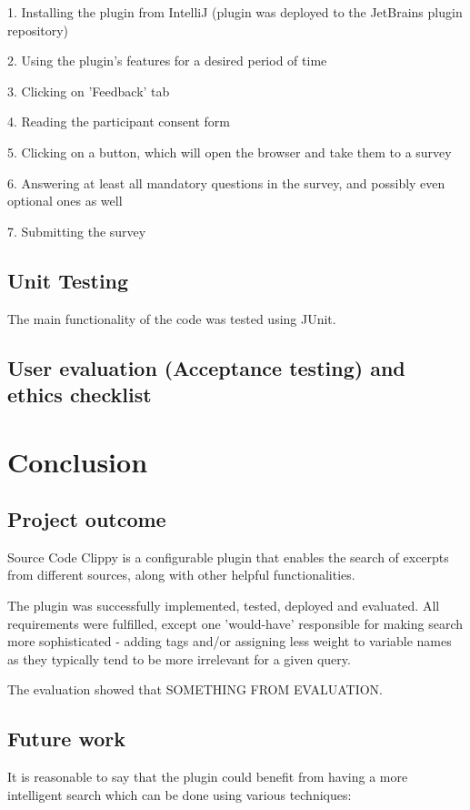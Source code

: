 \documentclass{l4proj}
\begin{document}
1. Installing the plugin from IntelliJ (plugin was deployed to the JetBrains plugin repository)

2. Using the plugin's features for a desired period of time

3. Clicking on 'Feedback' tab

4. Reading the participant consent form

5. Clicking on a button, which will open the browser and take them to a survey

6. Answering at least all mandatory questions in the survey, and possibly even optional ones as well

7. Submitting the survey

\section{Unit Testing}
The main functionality of the code was tested using JUnit.

\section{User evaluation (Acceptance testing) and ethics checklist}

\chapter{Conclusion}

\section{Project outcome}

Source Code Clippy is a configurable plugin that enables the search of excerpts from different sources, along with other helpful functionalities.

The plugin was successfully implemented, tested, deployed and evaluated. All requirements were fulfilled, except one 'would-have' responsible for making search more sophisticated - adding tags and/or assigning less weight to variable names as they typically tend to be more irrelevant for a given query.

The evaluation showed that SOMETHING FROM EVALUATION.

\section{Future work}
It is reasonable to say that the plugin could benefit from having a more intelligent search which can be done using various techniques:
\end{document}
